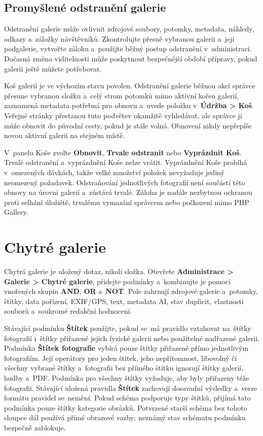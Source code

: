\documentclass[11pt,a4paper]{article}
\newcommand{\ui}[1]{\textbf{#1}}
\begin{document}
\subsection{Promyšlené odstranění galerie}

Odstranění galerie může ovlivnit zdrojové soubory, potomky, metadata, náhledy,
odkazy a~záložky návštěvníků. Zkontrolujte přesně vybranou galerii a~její
podgalerie, vytvořte zálohu a~použijte běžný postup odstranění v~administraci.
Dočasná změna viditelnosti může poskytnout bezpečnější období přípravy, pokud
galerii ještě můžete potřebovat.

Koš galerií je ve výchozím stavu povolen. Odstranění galerie běžnou akcí správce
přesune vybranou složku a~celý strom potomků mimo aktivní kořen galerií,
zaznamená metadata potřebná pro obnovu a~uvede položku v~\ui{Údržba > Koš}.
Veřejné stránky přestanou tuto podvětev okamžitě vyhledávat, ale správce ji může
obnovit do původní cesty, pokud je stále volná. Obnovení nikdy nepřepíše novou
aktivní galerii na stejném místě.

V~panelu Koše zvolte \ui{Obnovit}, \ui{Trvale odstranit} nebo \ui{Vyprázdnit
Koš}. Trvalé odstranění a~vyprázdnění Koše nelze vrátit. Vyprázdnění Koše
probíhá v~omezených dávkách, takže velké množství položek nevyžaduje jediný
neomezený požadavek. Odstraňování jednotlivých fotografií není součástí této
obnovy na úrovni galerií a~zůstává trvalé. Záloha je nadále nezbytnou ochranou
proti selhání úložiště, trvalému vymazání správcem nebo poškození mimo PHP
Gallery.
\section{Chytré galerie}

Chytrá galerie je uložený dotaz, nikoli složka. Otevřete \ui{Administrace >
Galerie > Chytré galerie}, přidejte podmínky a~kombinujte je pomocí vnořených
skupin \ui{AND}, \ui{OR} a~\ui{NOT}. Pole zahrnují zdrojové galerie a~potomky,
štítky, data pořízení, EXIF/GPS, text, metadata AI, stav duplicit, vlastnosti
souborů a~soukromé redakční hodnocení.

Stávající podmínku \ui{Štítek} použijte, pokud se~má pravidlo vztahovat
na~štítky
fotografií i~štítky přiřazené jejich fyzické galerii nebo použitelné nadřazené
galerii. Podmínka \ui{Štítek fotografie} vybírá pouze štítky přiřazené přímo
jednotlivým fotografiím. Její operátory pro jeden štítek, jeho nepřítomnost,
libovolný či všechny vybrané štítky a~fotografii bez přímého štítku ignorují
štítky galerií, hudby a~PDF. Podmínka pro všechny štítky vyžaduje, aby byly
přiřazeny téže fotografii. Stávající uložená pravidla \ui{Štítek} zachovají
dosavadní výsledky a~verze formátu pravidel se~nemění. Pokud schéma podporuje
typy štítků, přijímá tato podmínka pouze štítky kategorie obrázků. Potvrzené
starší schéma bez tohoto sloupce dál používá přímé obrazové vazby; neznámý stav
schématu podmínku bezpečně zablokuje.
\end{document}
